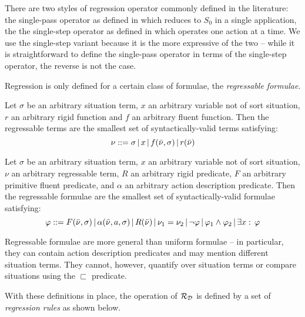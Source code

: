 There are two styles of regression operator commonly defined in the
literature: the single-pass operator as defined in \citep{pirri99contributions_sitcalc}
which reduces to $S_{0}$ in a single application, the the single-step
operator as defined in \citep{scherl03sc_knowledge} which operates
one action at a time. We use the single-step variant because it is
the more expressive of the two -- while it is straightforward to define
the single-pass operator in terms of the single-step operator, the
reverse is not the case.

Regression is only defined for a certain class of formulae, the \emph{regressable
formulae}.

\begin{defnL}
 Let $\sigma$ be an arbitrary situation
term, $x$ an arbitrary variable not of sort situation, $r$ an arbitrary
rigid function and $f$ an arbitrary fluent function. Then the regressable
terms are the smallest set of syntactically-valid terms satisfying:
\[
\nu::=\sigma\,|\, x\,|\, f(\bar{\nu},\sigma)\,|\, r(\bar{\nu})\]

\begin{defnL}
 Let $\sigma$ be an arbitrary situation
term, $x$ an arbitrary variable not of sort situation, $\nu$ an
arbitrary regressable term, $R$ an arbitrary rigid predicate, $F$
an arbitrary primitive fluent predicate, and $\alpha$ an arbitrary
action description predicate. Then the regressable formulae are the
smallest set of syntactically-valid formulae satisfying: \[
\varphi::=F(\bar{\nu},\sigma)\,|\,\alpha(\bar{\nu},a,\sigma)\,|\, R(\bar{\nu})\,|\,\nu_{1}=\nu_{2}\,|\,\neg\varphi\,|\,\varphi_{1}\wedge\varphi_{2}\,|\,\exists x:\,\varphi\]

\end{defnL}
\end{defnL}
Regressable formulae are more general than uniform formulae -- in
particular, they can contain action description predicates and may
mention different situation terms. They cannot, however, quantify
over situation terms or compare situations using the $\sqsubset$
predicate.

With these definitions in place, the operation of $\mathcal{R}_{\mathcal{D}}$ is
defined by a set of \emph{regression rules} as shown below.

